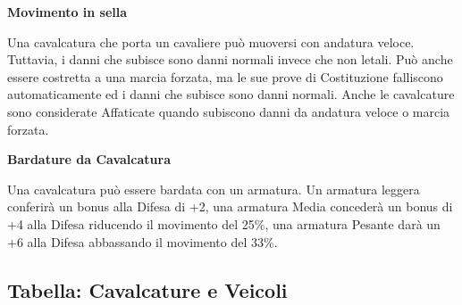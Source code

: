 \begin{multicols}{2}
\textbf{Movimento in sella}\label{movimentoacavallo}

Una cavalcatura che porta un cavaliere può muoversi con andatura veloce. Tuttavia, i danni che subisce sono danni normali invece che non letali. Può anche essere costretta a una marcia forzata, ma le sue prove di Costituzione falliscono automaticamente ed i danni che subisce sono danni normali. Anche le cavalcature sono considerate Affaticate quando subiscono danni da andatura veloce o marcia forzata.

\textbf{Bardature da Cavalcatura}\label{ArmaturedaCavallo}\hypertarget{ArmaturedaCavallo}{}

Una cavalcatura può essere bardata con un armatura. Un armatura leggera conferirà un bonus alla Difesa di +2, una armatura Media concederà un bonus di +4 alla Difesa riducendo il movimento del 25\%, una armatura Pesante darà un +6 alla Difesa abbassando il movimento del 33\%.

\end{multicols}


\subsection{Tabella: Cavalcature e Veicoli}\label{TabellaCavalcatureeVeicoli}\hypertarget{TabellaCavalcatureeVeicoli}{}

\medskip

\label{tabella-cavalcature-e-veicoli}\hypertarget{tabella-cavalcature-e-veicoli}{}

